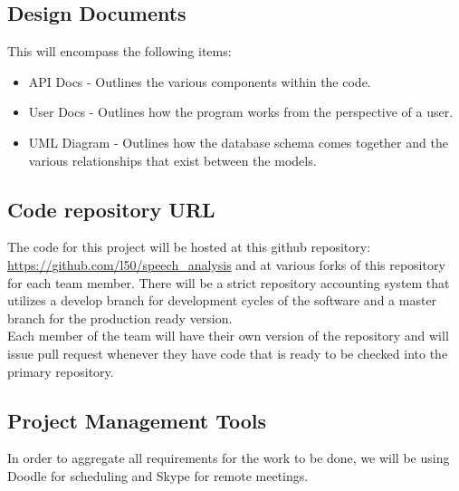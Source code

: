 \documentclass[12pt, a4paper, oneside]{article}
\begin{document}
\subsection*{Design Documents}

This will encompass the following items: 

\begin{itemize}
\item API Docs - Outlines the various components within the code.
\item User Docs - Outlines how the program works from the perspective of a user.
\item UML Diagram - Outlines how the database schema comes together and the various relationships that exist between the models.
\end{itemize}

\subsection*{Code repository URL}
The code for this project will be hosted at this github repository: \url{https://github.com/l50/speech_analysis} and at various forks of this repository for each team member. There will be a strict repository accounting system that utilizes a develop branch for development cycles of the software and a master branch for the production ready version. \\

Each member of the team will have their own version of the repository and will issue pull request whenever they have code that is ready to be checked into the primary repository.

\subsection*{Project Management Tools}
In order to aggregate all requirements for the work to be done, we will be using Doodle for scheduling and Skype for remote meetings.
\end{document}
